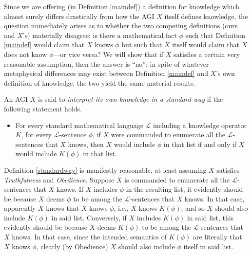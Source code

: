 \documentclass[runningheads]{llncs}
\begin{document}
Since we are offering (in Definition \ref{maindef}) a definition for knowledge
which almost surely differs drastically from how the AGI $X$ itself defines knowledge,
the question immediately arises as to whether the two competing definitions (ours and
$X$'s) materially disagree: is there a mathematical fact $\phi$ such that
Definition \ref{maindef} would claim that $X$ knows $\phi$ but such that $X$ itself
would claim that $X$ does not know $\phi$---or vice versa? We will show that if $X$
satisfies a certain very reasonable assumption, then the answer is ``no'': in spite
of whatever metaphysical differences may exist between Definition \ref{maindef} and
$X$'s own definition of knowledge, the two yield the same material results.

\begin{definition}
\label{standardway}
  An AGI $X$ is said to \emph{interpret its own knowledge in a standard way} if
  the following statement holds.
  \begin{itemize}
    \item
    For every standard mathematical language $\mathscr L$
    including a knowledge operator $K$, for every $\mathscr L$-sentence $\phi$,
    if $X$ were commanded to enumerate all the $\mathscr L$-sentences that $X$
    knows, then $X$ would include $\phi$ in that list if and only if $X$ would
    include $K(\phi)$ in that list.
  \end{itemize}
\end{definition}

Definition \ref{standardway} is manifestly reasonable, at least assuming $X$ satisfies
\emph{Truthfulness} and \emph{Obedience}. Suppose $X$ is commanded to enumerate all
the $\mathscr L$-sentences that $X$ knows. If $X$ includes $\phi$ in the resulting
list, it evidently should be because $X$ deems $\phi$ to be among the $\mathscr L$-sentences
that $X$ knows. In that case, apparently $X$ knows that $X$ knows $\phi$, i.e., $X$
knows $K(\phi)$, and so $X$ should also include $K(\phi)$ in said list. Conversely,
if $X$ includes $K(\phi)$ in said list, this evidently should be because $X$ deems
$K(\phi)$ to be among the $\mathscr L$-sentences that $X$ knows. In that case, since
the intended semantics of $K(\phi)$ are literally that $X$ knows $\phi$, clearly (by
Obedience) $X$ should also include $\phi$ itself in said list.



\end{document}

